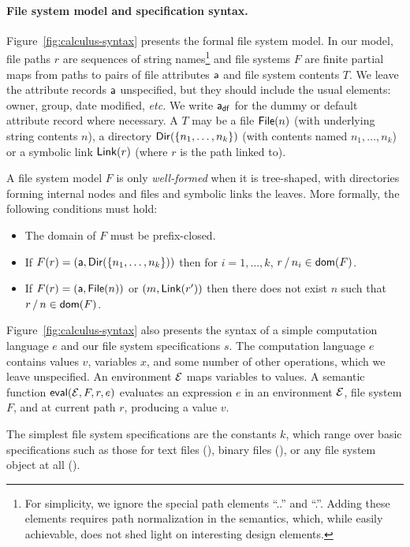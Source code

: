 \documentclass[nocopyrightspace,natbib]{sigplanconf}
\begin{document}
\paragraph*{File system model and specification syntax.}
Figure~\ref{fig:calculus-syntax} presents the formal file system model.  
In our model, file paths $r$ are
sequences of string names\footnote{For simplicity, we ignore the special path
elements ``..'' and ``.''.  Adding these elements
requires path normalization in the semantics, which, while easily
achievable, does not shed light on interesting design elements.} 
and file systems $F$
are finite partial maps from paths to pairs of file attributes $\mathsf{a}$
and file system contents $T$.  We leave the attribute records $\mathsf{a}$ 
unspecified, but they should include the usual elements: owner, group,
date modified, {\it etc.}  We write $\mathsf{a}_{\mathsf{df}}$ for the dummy or
default attribute record where necessary.
A $T$ may be a file $\mathsf{File}(n)$ (with underlying string contents $n$),
a directory $\mathsf{Dir}( \{ n_1,\dots,n_k \} )$ (with contents named 
$n_1, \ldots, n_k$) or a symbolic link $\mathsf{Link}(r)$ (where $r$ is the
path linked to).  

A file system model $F$ is only {\em well-formed} when it is tree-shaped,
with directories forming internal nodes and files and symbolic
links the leaves.  More formally, the following conditions must hold:
\begin{itemize}
\item The domain of $F$ must be prefix-closed.
\item If $F(r) = (\mathsf{a},\mathsf{Dir}( \{ n_1,\dots,n_k \} ))$ then for $i=1,\ldots,k$,
$r\,\textsf{/}\,n_i \in \mathsf{dom}(F)$.
\item  If $F(r) = (\mathsf{a},\mathsf{File}(n))$ or $(m,\mathsf{Link}(r'))$ then 
there does not exist $n$ such that $r\,\textsf{/}\,n \in \mathsf{dom}(F)$.
\end{itemize}

Figure~\ref{fig:calculus-syntax} also presents the syntax of
a simple computation language $e$ and our
file system specifications $s$.  The computation language $e$
contains values $v$, variables $x$, and some number of other
operations, which we leave unspecified.  An environment
$\mathcal{E}$ maps variables to values.  A semantic function
$\mathsf{eval}(\mathcal{E},F,r,e)$ evaluates an expression $e$ in an
environment $\mathcal{E}$, file system $F$, and at current path $r$,
producing a value $v$.

The simplest file system specifications are the constants
$k$, which range over basic specifications such as those for
text files (\ptext), binary files (\pbin), or any
file system object at all (\pany). 
\end{document}
